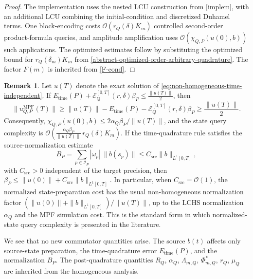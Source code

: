 \documentclass[10pt,reqno]{article}
\numberwithin{equation}{section}
\theoremstyle{plain}
\theoremstyle{definition}
\newtheorem{remark}[thm]{Remark}
\begin{document}
\begin{proof}
The implementation uses the nested LCU construction from \cref{implem}, with an additional LCU combining the initial-condition and discretized Duhamel terms. One block-encoding costs \(\mathcal O(r_Q(\delta)K_m)\) controlled second-order product-formula queries, and amplitude amplification uses \(\mathcal O(\chi_{Q,P}(u(0),b))\) such applications. The optimized estimates follow by substituting the optimized bound for \(r_Q(\delta_m)K_m\) from \cref{abstract-optimized-order-arbitrary-quadrature}. The factor \(F(m)\) is inherited from \cref{F-cond}.
\end{proof}

\begin{remark}\label{rem:nonhom-normalized-complexity-L1}
Let \(u(T)\) denote the exact solution of \cref{eq:non-homogeneous-time-independent}. If $E_{\operatorname{time}}(P)+\mathcal E_Q^{[0,T]}(r,\delta)\beta_P\leq \frac{\|u(T)\|}{2}$, then
\begin{equation}
\|u_{Q,P}^{\operatorname{MPF}}(T)\|\geq \|u(T)\|-E_{\operatorname{time}}(P)-\mathcal E_Q^{[0,T]}(r,\delta)\beta_P\geq \frac{\|u(T)\|}{2}.
\end{equation}
Consequently, \(\chi_{Q,P}(u(0),b)\leq 2\alpha_Q\beta_P/\|u(T)\|\), and the state query complexity is $\mathcal O\left(\frac{\alpha_Q\beta_P}{\|u(T)\|}\,r_Q(\delta)K_m\right)$.  If the time-quadrature rule satisfies the source-normalization estimate
\begin{equation}\label{eq:source-normalization-stability}
B_P=\sum_{p\in\mathcal I_P}|\omega_p|\,\|b(s_p)\|\leq C_{\operatorname{src}}\|b\|_{L^1[0,T]},
\end{equation}
with \(C_{\operatorname{src}} > 0\) independent of the target precision, then \(\beta_P\leq \|u(0)\|+C_{\operatorname{src}}\|b\|_{L^1[0,T]}\). In particular, when \(C_{\operatorname{src}}=\mathcal O(1)\), the normalized state-preparation cost has the usual non-homogeneous normalization factor \((\|u(0)\|+\|b\|_{L^1[0,T]})/\|u(T)\|\), up to the LCHS normalization \(\alpha_Q\) and the MPF simulation cost. This is the standard form in which normalized-state query complexity is presented in the literature.
\end{remark}

We see that no new commutator quantities arise. The source \(b(t)\) affects only source-state preparation, the time-quadrature error \(E_{\operatorname{time}}(P)\), and the normalization \(B_P\). The post-quadrature quantities \(R_Q\), \(\alpha_Q\), \(\Lambda_{m,Q}\), \(\Phi_{m,Q}^{\ast}\), \(r_Q\), \(\mu_Q\) are inherited from the homogeneous analysis.
\end{document}
